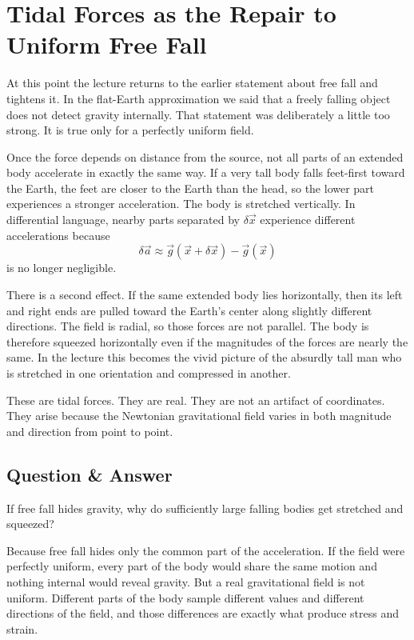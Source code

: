\section{Tidal Forces as the Repair to Uniform Free Fall}

At this point the lecture returns to the earlier statement about free fall and tightens it. In the flat-Earth approximation we said that a freely falling object does not detect gravity internally. That statement was deliberately a little too strong. It is true only for a perfectly uniform field.

Once the force depends on distance from the source, not all parts of an extended body accelerate in exactly the same way. If a very tall body falls feet-first toward the Earth, the feet are closer to the Earth than the head, so the lower part experiences a stronger acceleration. The body is stretched vertically. In differential language, nearby parts separated by \(\delta \vec x\) experience different accelerations because
\begin{equation}
\delta \vec a \approx \vec g(\vec x+\delta \vec x)-\vec g(\vec x)
\end{equation}
is no longer negligible.

There is a second effect. If the same extended body lies horizontally, then its left and right ends are pulled toward the Earth's center along slightly different directions. The field is radial, so those forces are not parallel. The body is therefore squeezed horizontally even if the magnitudes of the forces are nearly the same. In the lecture this becomes the vivid picture of the absurdly tall man who is stretched in one orientation and compressed in another.

These are tidal forces. They are real. They are not an artifact of coordinates. They arise because the Newtonian gravitational field varies in both magnitude and direction from point to point.

\subsection{Question \& Answer}

If free fall hides gravity, why do sufficiently large falling bodies get stretched and squeezed?

Because free fall hides only the common part of the acceleration. If the field were perfectly uniform, every part of the body would share the same motion and nothing internal would reveal gravity. But a real gravitational field is not uniform. Different parts of the body sample different values and different directions of the field, and those differences are exactly what produce stress and strain.

